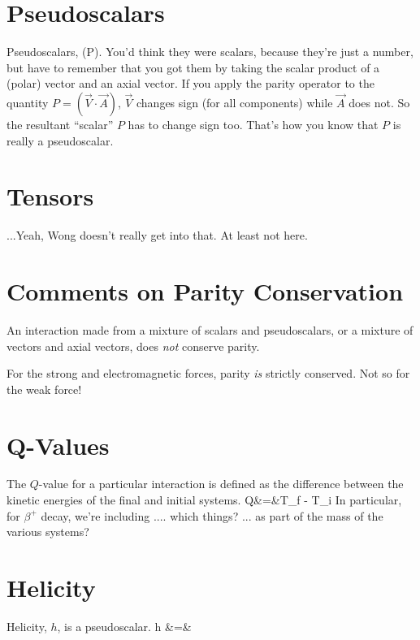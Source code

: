 \section{Pseudoscalars}
Pseudoscalars, (P).  You'd think they were scalars, because they're just a number, but have to remember that you got them by taking the scalar product of a (polar) vector and an axial vector.  If you apply the parity operator to the quantity $P = (\vec{V} \cdot \vec{A})$, $\vec{V}$ changes sign (for all components) while $\vec{A}$ does not.  So the resultant ``scalar'' $P$ has to change sign too.  That's how you know that $P$ is really a pseudoscalar.

\section{Tensors}
...Yeah, Wong doesn't really get into that.  At least not here.

\section{Comments on Parity Conservation}
An interaction made from a mixture of scalars and pseudoscalars, or a mixture of vectors and axial vectors, does \emph{not} conserve parity.  

For the strong and electromagnetic forces, parity \emph{is} strictly conserved.  Not so for the weak force!

\section{Q-Values}
The $Q$-value for a particular interaction is defined as the difference between the kinetic energies of the final and initial systems.
\bea
Q&=&T_f - T_i
\eea
In particular, for $\beta^+$ decay, we're including .... which things? ... as part of the mass of the various systems?  


\section{Helicity}
Helicity, $h$, is a pseudoscalar.
\bea
h &=& 
\eea

